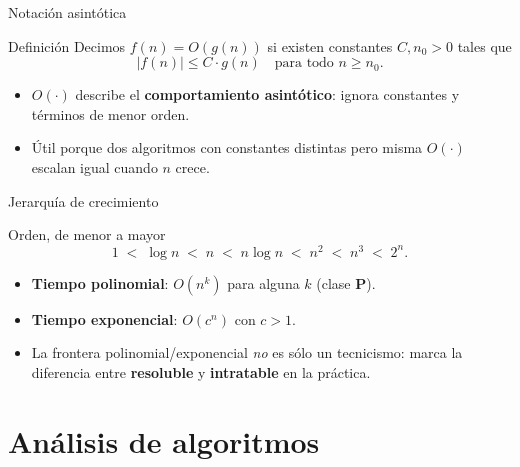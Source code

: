 \documentclass[10pt,xcolor=dvipsnames]{beamer}
\begin{document}
\begin{frame}{Notación asintótica}
  \begin{block}{Definición}
    Decimos $f(n) = O(g(n))$ si existen constantes $C, n_0 > 0$ tales que
    \[
      |f(n)| \leq C \cdot g(n) \quad \text{para todo } n \geq n_0.
    \]
  \end{block}

  \begin{itemize}
    \item $O(\cdot)$ describe el \textbf{comportamiento asintótico}: ignora
          constantes y términos de menor orden.
    \item Útil porque dos algoritmos con constantes distintas pero misma
          $O(\cdot)$ escalan igual cuando $n$ crece.
  \end{itemize}
\end{frame}

\begin{frame}{Jerarquía de crecimiento}
  \begin{block}{Orden, de menor a mayor}
    \[
      1 \;<\; \log n \;<\; n \;<\; n \log n \;<\; n^2 \;<\; n^3 \;<\; 2^n.
    \]
  \end{block}

  \begin{itemize}
    \item \textbf{Tiempo polinomial}: $O(n^k)$ para alguna $k$
          (clase \textbf{P}).
    \item \textbf{Tiempo exponencial}: $O(c^n)$ con $c > 1$.
    \item La frontera polinomial/exponencial \emph{no} es sólo un tecnicismo:
          marca la diferencia entre \textbf{resoluble} y
          \textbf{intratable} en la práctica.
  \end{itemize}
\end{frame}





\section{Análisis de algoritmos}
\end{document}

